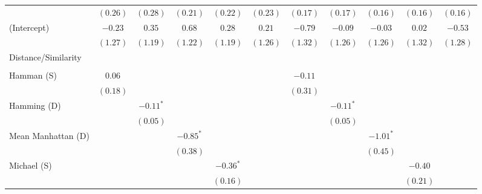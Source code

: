 \documentclass[
]{article}
\begin{document}
\begin{landscape}
\begin{table}
\begin{center}
\begin{tabular}{l c c c c c c c c c c }
                           & $(0.26)$    & $(0.28)$     & $(0.21)$    & $(0.22)$     & $(0.23)$    & $(0.17)$    & $(0.17)$     & $(0.16)$    & $(0.16)$    & $(0.16)$    \\
(Intercept)                & $-0.23$     & $0.35$       & $0.68$      & $0.28$       & $0.21$      & $-0.79$     & $-0.09$      & $-0.03$     & $0.02$      & $-0.53$     \\
                           & $(1.27)$    & $(1.19)$     & $(1.22)$    & $(1.19)$     & $(1.26)$    & $(1.32)$    & $(1.26)$     & $(1.26)$    & $(1.32)$    & $(1.28)$    \\
Distance/Similarity        &             &              &             &              &             &             &              &             &             &             \\
                           &             &              &             &              &             &             &              &             &             &             \\
\quad Hamman (S)           & $0.06$      &              &             &              &             & $-0.11$     &              &             &             &             \\
                           & $(0.18)$    &              &             &              &             & $(0.31)$    &              &             &             &             \\
\quad Hamming (D)          &             & $-0.11^{*}$  &             &              &             &             & $-0.11^{*}$  &             &             &             \\
                           &             & $(0.05)$     &             &              &             &             & $(0.05)$     &             &             &             \\
\quad Mean Manhattan (D)   &             &              & $-0.85^{*}$ &              &             &             &              & $-1.01^{*}$ &             &             \\
                           &             &              & $(0.38)$    &              &             &             &              & $(0.45)$    &             &             \\
\quad Michael (S)          &             &              &             & $-0.36^{*}$  &             &             &              &             & $-0.40$     &             \\
                           &             &              &             & $(0.16)$     &             &             &              &             & $(0.21)$    &             \\

\end{tabular}
\end{center}
\end{table}
\end{landscape}
\end{document}
